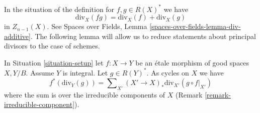 \noindent
In the situation of the definition for $f, g \in R(X)^*$ we have
$$
\text{div}_X(fg) = \text{div}_X(f) + \text{div}_X(g)
$$
in $Z_{n - 1}(X)$. See Spaces over Fields, Lemma
\ref{spaces-over-fields-lemma-div-additive}.
The following lemma will allow us to reduce
statements about principal divisors to the case of schemes.

\begin{lemma}
\label{lemma-etale-pullback-principal-divisor}
In Situation \ref{situation-setup} let $f : X \to Y$ be an \'etale
morphism of good spaces $X, Y/B$. Assume $Y$ is integral.
Let $g \in R(Y)^*$. As cycles on $X$ we have
$$
f^*(\text{div}_Y(g)) =
\sum\nolimits_{X'} (X' \to X)_*\text{div}_{X'}(g \circ f|_{X'})
$$
where the sum is over the irreducible components of $X$
(Remark \ref{remark-irreducible-component}).
\end{lemma}

